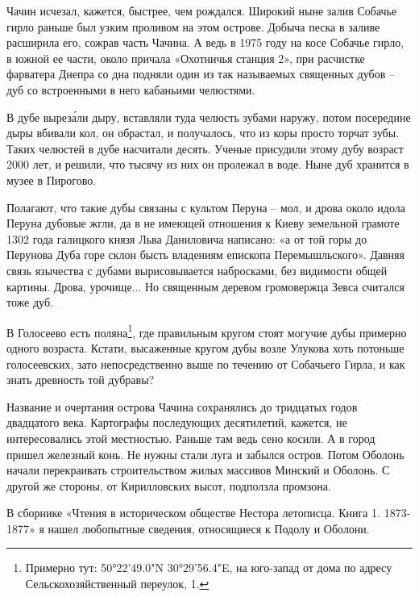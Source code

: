 Чачин исчезал, кажется, быстрее, чем рождался. Широкий ныне залив Собачье гирло раньше был узким проливом на этом острове. Добыча песка в заливе расширила его, сожрав часть Чачина. А ведь в 1975 году на косе Собачье гирло, в южной ее части, около причала «Охотничья станция 2», при расчистке фарватера Днепра со дна подняли один из так называемых священных дубов – дуб со встроенными в него кабаньими челюстями.

В дубе вырез\'али дыру, вставляли туда челюсть зубами наружу, потом посередине дыры вбивали кол, он обрастал, и получалось, что из коры просто торчат зубы. Таких челюстей в дубе насчитали десять. Ученые присудили этому дубу возраст 2000 лет, и решили, что тысячу из них он пролежал в воде. Ныне дуб хранится в музее в Пирогово.

Полагают, что такие дубы связаны с культом Перуна – мол, и дрова около идола Перуна дубовые жгли, да в не имеющей отношения к Киеву земельной грамоте 1302 года галицкого князя Льва Даниловича написано: «а от той горы до Перунова Дуба горе склон бысть владениям епископа Перемышльского». Давняя связь язычества с дубами вырисовывается набросками, без видимости общей картины. Дрова, урочище... Но священным деревом громовержца Зевса считался тоже дуб.

В Голосеево есть поляна\footnote{Примерно тут: 50°22'49.0"N 30°29'56.4"E, на юго-запад от дома по адресу Сельскохозяйственный переулок, 1.}, где правильным кругом стоят могучие дубы примерно одного возраста. Кстати, высаженные кругом дубы возле Улукова хоть потоньше голосеевских, зато непосредственно выше по течению от Собачьего Гирла, и как знать древность той дубравы?


Название и очертания острова Чачина сохранялись до тридцатых годов двадцатого века. Картографы последующих десятилетий, кажется, не интересовались этой местностью. Раньше там ведь сено косили. А в город пришел железный конь. Не нужны стали луга и забылся остров. Потом Оболонь начали перекраивать строительством жилых массивов Минский и Оболонь. С другой же стороны, от Кирилловских высот, подползла промзона.

В сборнике «Чтения в историческом обществе Нестора летописца. Книга 1. 1873-1877» я нашел любопытные сведения, относящиеся к Подолу и Оболони. 

